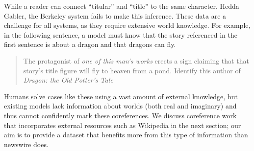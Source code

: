 While a reader can connect ``titular'' and ``title'' to the same character,
Hedda Gabler, the Berkeley system fails to make this inference. These data are a
challenge for all systems, as they require extensive world knowledge.  For
example, in the following sentence, a model must know that the story referenced
in the first sentence is about a dragon and that dragons can fly.
\begin{quote}
  The protagonist of \emph{one of this man's works} erects a sign claiming that
  that story's title figure will fly to heaven from a pond. Identify this author
  of \emph{Dragon: the Old Potter's Tale}
\end{quote}

Humans solve cases like these using a vast amount of external knowledge, but
existing models lack information about worlds (both real and imaginary) and thus
cannot confidently mark these coreferences. We discuss coreference work that
incorporates external resources such as Wikipedia in the next section; our aim
is to provide a dataset that benefits more from this type of information than
newswire does.

